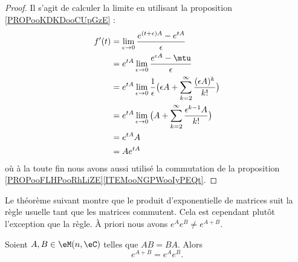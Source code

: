 \begin{proof}
    Il s'agit de calculer la limite en utilisant la proposition \ref{PROPooKDKDooCUpGzE} :
    \begin{subequations}
        \begin{align}
            f'(t)&=\lim_{\epsilon\to 0}\frac{  e^{(t+\epsilon)A}- e^{tA} }{ \epsilon }\\
            &= e^{tA}\lim_{\epsilon\to 0}\frac{  e^{\epsilon A}-\mtu }{ \epsilon }\\
            &= e^{tA}\lim_{\epsilon\to 0}\frac{1}{ \epsilon }\big( \epsilon A+\sum_{k=2}^{\infty}\frac{ (\epsilon A)^k }{ k! } \big)\\
            &= e^{tA}\lim_{\epsilon\to 0}\big( A+\sum_{k=2}^{\infty}\frac{ \epsilon^{k-1}A }{ k! } \big)\\
            &=  e^{tA}A\\
            &= A e^{tA}
        \end{align}
    \end{subequations}
    où à la toute fin nous avons aussi utilisé la commutation de la proposition \ref{PROPooFLHPooRhLiZE}\ref{ITEMooNGPWooIyPEQt}.
\end{proof}

Le théorème suivant montre que le produit d'exponentielle de matrices suit la règle usuelle tant que les matrices commutent. Cela est cependant plutôt l'exception que la règle. À priori nous avons \(  e^{A} e^{B}\neq  e^{A+B}\).
\begin{theorem}       \label{THOooXCPEooYGyLOp}
    Soient \( A,B\in \eM(n,\eC)\) telles que \( AB=BA\). Alors
    \begin{equation}
        e^{A+B}= e^{A} e^{B}.
    \end{equation}
\end{theorem}

